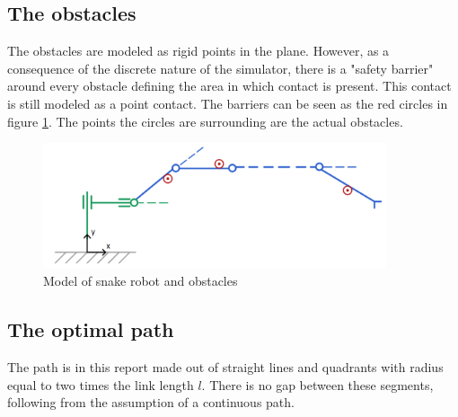

\subsection{The obstacles}

The obstacles are modeled as rigid points in the plane. However, as a consequence of the discrete nature of the simulator, there is a "safety barrier" around every obstacle defining the area in which contact is present. This contact is still modeled as a point contact. The barriers can be seen as the red circles in figure \ref{fig:2_kin_obst}. The points the circles are surrounding are the actual obstacles.

\begin{figure}
    \centering
    \includegraphics[width=0.9\textwidth]{figures/kinematics_obstacles_noname.PNG}
    \caption{Model of snake robot and obstacles}
    \label{fig:2_kin_obst}
\end{figure}


\subsection{The optimal path}

The path is in this report made out of straight lines and quadrants with radius equal to two times the link length $l$. There is no gap between these segments, following from the assumption of a continuous path.